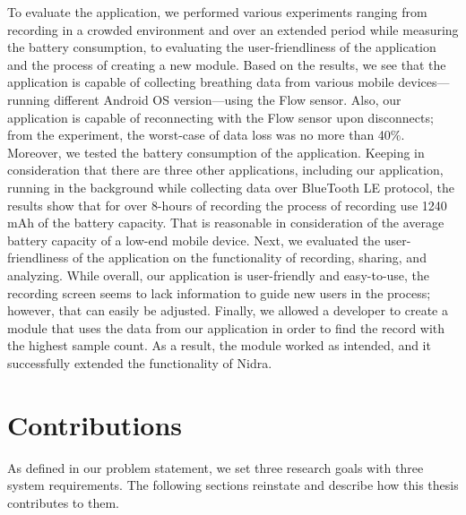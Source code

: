 To evaluate the application, we performed various experiments ranging from recording in a crowded environment and over an extended period while measuring the battery consumption, to evaluating the user-friendliness of the application and the process of creating a new module. Based on the results, we see that the application is capable of collecting breathing data from various mobile devices---running different Android OS version---using the Flow sensor. Also, our application is capable of reconnecting with the Flow sensor upon disconnects; from the experiment, the worst-case of data loss was no more than 40\%. Moreover, we tested the battery consumption of the application. Keeping in consideration that there are three other applications, including our application, running in the background while collecting data over BlueTooth LE protocol, the results show that for over 8-hours of recording the process of recording use 1240 mAh of the battery capacity. That is reasonable in consideration of the average battery capacity of a low-end mobile device. Next, we evaluated the user-friendliness of the application on the functionality of recording, sharing, and analyzing. While overall, our application is user-friendly and easy-to-use, the recording screen seems to lack information to guide new users in the process; however, that can easily be adjusted. Finally, we allowed a developer to create a module that uses the data from our application in order to find the record with the highest sample count. As a result, the module worked as intended, and it successfully extended the functionality of Nidra. 


\section{Contributions}
 As defined in our problem statement, we set three research goals with three system requirements. The following sections reinstate and describe how this thesis contributes to them.

